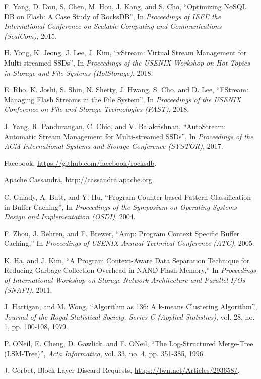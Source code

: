 \begin{thebibliography}{00}
F. Yang, D. Dou, S. Chen, M. Hou, J. Kang, and S. Cho,
``Optimizing NoSQL DB on Flash: A Case Study of RocksDB'',
In \textit{Proceedings of IEEE the International Conference on Scalable Computing
and Communications (ScalCom)}, 2015.

H. Yong, K. Jeong, J. Lee, J. Kim,
``vStream: Virtual Stream Management for Multi-streamed SSDs'',
In \textit{Proceedings of the USENIX Workshop on Hot Topics in Storage
and File Systems (HotStorage)}, 2018.

E. Rho, K. Joshi, S. Shin, N. Shetty, J. Hwang, S. Cho. and D. Lee,
``FStream: Managing Flash Streams in the File System'',
In \textit{Proceedings of the USENIX Conference on File and Storage Technologies (FAST)}, 2018.

J. Yang, R. Pandurangan, C. Chio, and V. Balakrishnan,
``AutoStream: Automatic Stream Management for Multi-streamed SSDs'',
In \textit{Proceedings of the ACM International Systems and Storage Conference (SYSTOR)}, 2017.

Facebook,
\url{https://github.com/facebook/rocksdb}.

Apache Cassandra,
\url{http://cassandra.apache.org}.


C. Gniady, A. Butt, and Y. Hu,
``Program-Counter-based Pattern Classification in Buffer Caching'',
In \textit{Proceedings of the Symposium on Operating Systems Design and Implementation (OSDI)}, 2004.

F. Zhou, J. Behren, and E. Brewer,
``Amp: Program Context Specific Buffer Caching,''
In \textit{Proceedings of USENIX Annual Technical Conference (ATC)}, 2005.

K. Ha, and J. Kim,
``A Program Context-Aware Data Separation Technique for Reducing Garbage Collection Overhead in NAND Flash Memory,''
In \textit{Proceedings of International Workshop on Storage Network Architecture 
and Parallel I/Os (SNAPI)}, 2011.

J. Hartigan, and M. Wong,
``Algorithm as 136: A k-means Clustering Algorithm'',
\textit{Journal of the Royal Statistical Society. Series C (Applied Statistics)},
vol. 28, no. 1, pp. 100-108, 1979.

P. ONeil, E. Cheng, D. Gawlick, and E. ONeil,
``The Log-Structured Merge-Tree (LSM-Tree)'',
\textit{Acta Informatica}, vol. 33, no. 4, pp. 351-385, 1996.

J. Corbet,
Block Layer Discard Requests,
\url{https://lwn.net/Articles/293658/}.


\end{thebibliography}
